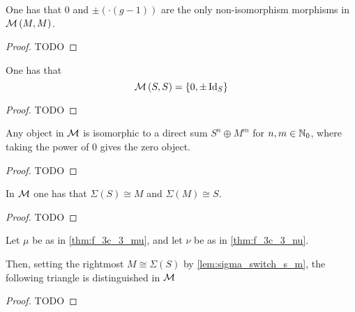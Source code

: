 \begin{lemma} \label{lem:only_non_surjective_M_to_M}
    One has that \( 0 \) and \( \pm(\cdot(g - 1)) \) are the only non-isomorphism morphisms in \( {\mathcal{M}}\left( M, M \right) \).
\end{lemma}
\begin{proof}
    TODO
\end{proof}

\begin{lemma} \label{lem:S-to-S}
    One has that
    \[
        {\mathcal{M}}\left( S, S \right) = \left\{ 0, \pm \operatorname{Id}_S \right\}
    \]
\end{lemma}
\begin{proof}
    TODO
\end{proof}

\begin{lemma} \label{thm:f_3c_3_decomposition}
    Any object in \( {\mathcal{M}} \) is isomorphic to a direct sum \( S^n \oplus M^m \) for \( n, m \in {\mathbb{N}}_0 \), where taking the power of \( 0 \) gives the zero object.
\end{lemma}
\begin{proof}
    TODO
\end{proof}

\begin{lemma} \label{lem:sigma_switch_s_m}
    In \( {\mathcal{M}} \) one has that \( \Sigma(S) \cong M \) and \( \Sigma(M) \cong S \).
\end{lemma}
\begin{proof}
    TODO
\end{proof}

\begin{lemma} \label{lem:s_m_s_distinguished}
    Let \( \mu \) be as in \autoref{thm:f_3c_3_mu}, and let \( \nu \) be as in \autoref{thm:f_3c_3_nu}.

    Then, setting the rightmost \( M \cong \Sigma(S) \) by \autoref{lem:sigma_switch_s_m}, the following triangle is distinguished in \( {\mathcal{M}} \)
    \begin{center}
    \end{center}
\end{lemma}
\begin{proof}
    TODO
\end{proof}